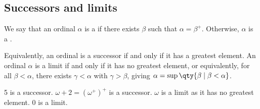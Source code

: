 \subsection{Successors and limits}
\begin{definition}
    We say that an ordinal $\alpha$ is a  if there exists $\beta$ such that $\alpha = \beta^+$.
    Otherwise, $\alpha$ is a .
\end{definition}
Equivalently, an ordinal is a successor if and only if it has a greatest element.
An ordinal $\alpha$ is a limit if and only if it has no greatest element, or equivalently, for all $\beta < \alpha$, there exists $\gamma < \alpha$ with $\gamma > \beta$, giving $\alpha = \sup \qty{\beta \mid \beta < \alpha}$.
\begin{example}
    5 is a successor.
    $\omega + 2 = (\omega^+)^+$ is a successor.
    $\omega$ is a limit as it has no greatest element.
    0 is a limit.
\end{example}

